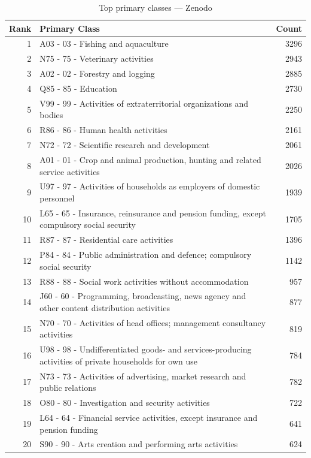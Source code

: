 \clearpage

\begin{table}[H]
    \centering
    \begin{tabular}{r p{10cm} r}
    \hline
    \textbf{Rank} & \textbf{Primary Class} & \textbf{Count} \\
    \hline
    1 & A03 - 03 - Fishing and aquaculture & 3296 \\
    2 & N75 - 75 - Veterinary activities & 2943 \\
    3 & A02 - 02 - Forestry and logging & 2885 \\
    4 & Q85 - 85 - Education & 2730 \\
    5 & V99 - 99 - Activities of extraterritorial organizations and bodies & 2250 \\
    6 & R86 - 86 - Human health activities & 2161 \\
    7 & N72 - 72 - Scientific research and development & 2061 \\
    8 & A01 - 01 - Crop and animal production, hunting and related service activities & 2026 \\
    9 & U97 - 97 - Activities of households as employers of domestic personnel & 1939 \\
    10 & L65 - 65 - Insurance, reinsurance and pension funding, except compulsory social security & 1705 \\
    11 & R87 - 87 - Residential care activities & 1396 \\
    12 & P84 - 84 - Public administration and defence; compulsory social security & 1142 \\
    13 & R88 - 88 - Social work activities without accommodation & 957 \\
    14 & J60 - 60 - Programming, broadcasting, news agency and other content distribution activities & 877 \\
    15 & N70 - 70 - Activities of head offices; management consultancy activities & 819 \\
    16 & U98 - 98 - Undifferentiated goods- and services-producing activities of private households for own use & 784 \\
    17 & N73 - 73 - Activities of advertising, market research and public relations & 782 \\
    18 & O80 - 80 - Investigation and security activities & 722 \\
    19 & L64 - 64 - Financial service activities, except insurance and pension funding & 641 \\
    20 & S90 - 90 - Arts creation and performing arts activities & 624 \\
    \hline
    \end{tabular}
    \caption{Top primary classes --- Zenodo}
\end{table}

